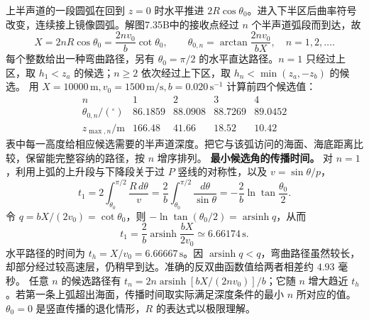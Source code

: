 \documentclass[UTF8,fontset=fandol,a4paper,11pt]{ctexart}
\newcommand{\figcaption}[1]{\par\vspace{2pt}{\small\color{muted}#1}\par}
\begin{document}
\begin{center}\begin{minipage}{\linewidth}\centering{}\figcaption{解图 7.35B}\end{minipage}\end{center}
上半声道的一段圆弧在回到 $z=0$ 时水平推进 $2R\cos\theta_0$。进入下半区后曲率符号改变，连续接上镜像圆弧。解图7.35B中的接收点经过 $n$ 个半声道弧段而到达，故
\[X=2nR\cos\theta_0=\frac{2nv_0}{b}\cot\theta_0,
\qquad\boxed{\theta_{0,n}=\arctan\frac{2nv_0}{bX},\quad n=1,2,\ldots.}\]
每个整数给出一种弯曲路径，另有 $\theta_0=\pi/2$ 的水平直达路径。$n=1$ 只经过上区，取 $h_1<z_a$ 的候选；$n\ge2$ 依次经过上下区，取 $h_n<\min(z_a,-z_b)$ 的候选。
用 $X=10000\,\mathrm m,v_0=1500\,\mathrm{m/s},b=0.020\,\mathrm{s^{-1}}$ 计算前四个候选值：
\[\begin{array}{c|rrrr}n&1&2&3&4\\\hline
\theta_{0,n}/(^\circ)&86.1859&88.0908&88.7269&89.0452\\
z_{\max,n}/\mathrm m&166.48&41.66&18.52&10.42\end{array}\]
表中每一高度给相应候选需要的半声道深度。把它与该弧访问的海面、海底距离比较，保留能完整容纳的路径，按 $n$ 增序排列。
\textbf{最小候选角的传播时间。} 对 $n=1$，利用上弧的上升段与下降段关于过 $P$ 竖线的对称性，以及 $v=\sin\theta/p$，
\[t_1=2\int_{\theta_0}^{\pi/2}\frac{R\,d\theta}{v}
=\frac2b\int_{\theta_0}^{\pi/2}\frac{d\theta}{\sin\theta}
=-\frac2b\ln\tan\frac{\theta_0}{2}.\]
令 $q=bX/(2v_0)=\cot\theta_0$，则 $-\ln\tan(\theta_0/2)=\operatorname{arsinh}q$，从而
\[\boxed{t_1=\frac2b\operatorname{arsinh}\frac{bX}{2v_0}\simeq6.66174\,\mathrm s.}\]
水平路径的时间为 $t_h=X/v_0=6.66667\,\mathrm s$。因 $\operatorname{arsinh}q<q$，弯曲路径虽然较长，却部分经过较高速层，仍稍早到达。准确的反双曲函数值给两者相差约 $4.93$ 毫秒。
任意 $n$ 的候选路径有 $t_n=2n\operatorname{arsinh}[bX/(2nv_0)]/b$；它随 $n$ 增大趋近 $t_h$。若第一条上弧超出海面，传播时间取实际满足深度条件的最小 $n$ 所对应的值。$\theta_0=0$ 是竖直传播的退化情形，$R$ 的表达式以极限理解。
\end{document}
